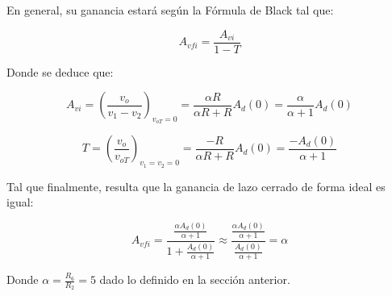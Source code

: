 \documentclass[12pt,a4paper]{article}
\begin{document}
En general, su ganancia estará según la Fórmula de Black tal que:

\begin{equation}
    \label{eq_11}
    A_{vfi} = \frac{A_{vi}}{1-T}
\end{equation}

Donde se deduce que:

\begin{equation}
    \label{eq_12}
    A_{vi} = \left(\frac{v_{o}}{v_{1}-v_{2}}\right)_{v_{oT}=0} = \frac{\alpha R }{\alpha R+ R}A_{d}(0) = \frac{\alpha}{\alpha+1}A_{d}(0)
\end{equation}

\begin{equation}
    \label{eq_13}
    T = \left(\frac{v_{o}}{v_{oT}}\right)_{v_{1}=v_{2}=0} = \frac{-R}{\alpha R+ R}A_{d}(0) = \frac{-A_{d}(0)}{\alpha+1}
\end{equation}

Tal que finalmente, resulta que la ganancia de lazo cerrado de forma ideal es igual:

\begin{equation}
    \label{eq_14}
    A_{vfi} = \frac{\frac{\alpha A_{d}(0)}{\alpha+1}}{1 + \frac{A_{d}(0)}{\alpha+1}} \approx \frac{\frac{\alpha A_{d}(0)}{\alpha+1}}{\frac{A_{d}(0)}{\alpha+1}} = \alpha
\end{equation}

Donde $\alpha = \frac{R_{6}}{R_{2}}=5$ dado lo definido en la sección anterior.
\end{document}
